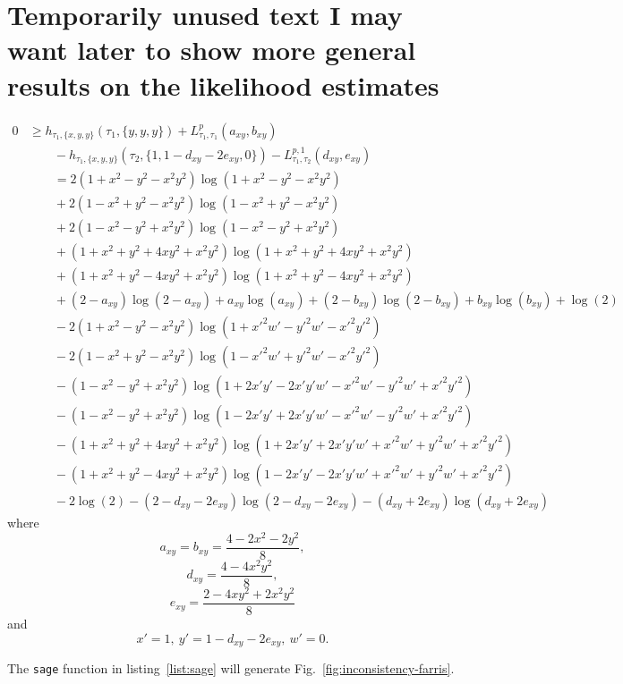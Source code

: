 \section{Temporarily unused text I may want later to show more general results on the likelihood estimates}

\begin{align*}
    0 &\ge h_{\tau_1,\{x,y,y\}}(\tau_1,\{y, y, y\}) + L^{p}_{\tau_1,\tau_1}(a_{xy},b_{xy}) \\
      &\qquad - h_{\tau_1,\{x,y,y\}}(\tau_2,\{1, 1-d_{xy}-2e_{xy}, 0\}) - L^{p,1}_{\tau_1,\tau_2}(d_{xy},e_{xy}) \\
%
      &\qquad = 2(1+x^2-y^2-x^2y^2)\log(1+x^2-y^2-x^2y^2) \\
      &\qquad + 2(1-x^2+y^2-x^2y^2)\log(1-x^2+y^2-x^2y^2) \\
      &\qquad + 2(1-x^2-y^2+x^2y^2)\log(1-x^2-y^2+x^2y^2) \\
      &\qquad + (1+x^2+y^2+4xy^2+x^2y^2)\log(1+x^2+y^2+4xy^2+x^2y^2) \\
      &\qquad + (1+x^2+y^2-4xy^2+x^2y^2)\log(1+x^2+y^2-4xy^2+x^2y^2) \\
%
      &\qquad + (2-a_{xy})\log(2-a_{xy})+a_{xy}\log(a_{xy})+(2-b_{xy})\log(2-b_{xy})+b_{xy}\log(b_{xy})+\log(2) \\
%
      &\qquad - 2(1+x^2-y^2-x^2y^2)\log(1+x'^2w'-y'^2w'-x'^2y'^2) \\
      &\qquad - 2(1-x^2+y^2-x^2y^2)\log(1-x'^2w'+y'^2w'-x'^2y'^2) \\
      &\qquad - (1-x^2-y^2+x^2y^2)\log(1+2x'y'-2x'y'w'-x'^2w'-y'^2w'+x'^2y'^2) \\
      &\qquad - (1-x^2-y^2+x^2y^2)\log(1-2x'y'+2x'y'w'-x'^2w'-y'^2w'+x'^2y'^2) \\
      &\qquad - (1+x^2+y^2+4xy^2+x^2y^2)\log(1+2x'y'+2x'y'w'+x'^2w'+y'^2w'+x'^2y'^2) \\
      &\qquad - (1+x^2+y^2-4xy^2+x^2y^2)\log(1-2x'y'-2x'y'w'+x'^2w'+y'^2w'+x'^2y'^2) \\
%
      &\qquad - 2\log(2)-(2-d_{xy}-2e_{xy})\log(2-d_{xy}-2e_{xy})-(d_{xy}+2e_{xy})\log(d_{xy}+2e_{xy})
\end{align*}
where
$$
a_{xy} = b_{xy} = \frac{4-2x^2-2y^2}{8},
$$
$$
d_{xy} = \frac{4-4x^2y^2}{8},
$$
$$
e_{xy} = \frac{2-4xy^2+2x^2y^2}{8}
$$
and
$$
x' = 1, \ y' = 1-d_{xy}-2e_{xy}, \ w' = 0.
$$

The \texttt{sage} function in listing~\ref{list:sage} will generate Fig.~\ref{fig:inconsistency-farris}.

